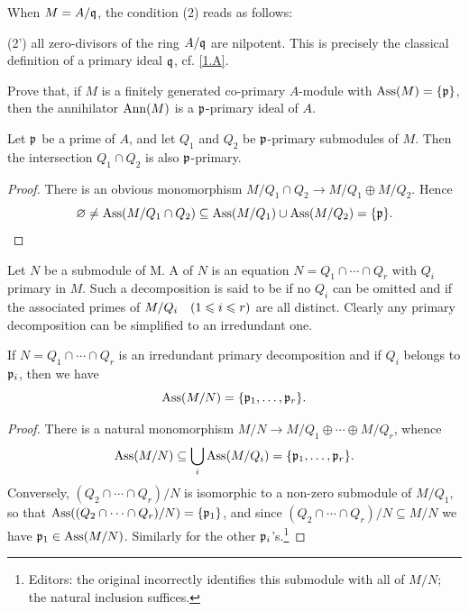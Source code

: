 \documentclass[../main]{subfiles}
\begin{document}
\begin{remark}
When $M = A/\mathfrak{q}$, the condition (2) reads as follows:

(2') all zero-divisors of the ring $A/\mathfrak{q}$ are nilpotent. 
This is precisely the classical definition of a primary ideal $\mathfrak{q}$, cf. \ref{1.A}.
\end{remark} 

\begin{exercise}
Prove that, if $M$ is a finitely generated co-primary $A$-module with $\operatorname{Ass}(M) = \{\mathfrak{p}\}$, then the annihilator $\operatorname{Ann}(M)$ is a $\mathfrak{p}$-primary ideal of $A$.
\end{exercise}

\newparagraph Let $\mathfrak{p}$ be a prime of $A$, and let $Q_1$ and $Q_2$ be $\mathfrak{p}$-primary submodules of $M$. Then the intersection $Q_1\cap Q_2$ is also $\mathfrak{p}$-primary.

\begin{proof}
There is an obvious monomorphism $M/Q_1\cap Q_2\longrightarrow M/Q_1\oplus M/Q_2$. Hence \[\varnothing\neq\operatorname{Ass}(M/Q_1\cap Q_2)\subseteq\operatorname{Ass}(M/Q_1)\cup\operatorname{Ass}(M/Q_2)=\{\mathfrak{p}\}.\]
\end{proof}

\newparagraph Let $N$ be a submodule of M. A  of $N$ is an equation $N = Q_1\cap\cdots\cap Q_r$ with $Q_i$ primary in $M$. Such a decomposition is said to be  if no $Q_i$ can be omitted and if the associated primes of $M/Q_i\for{1\leqslant i\leqslant r}$ are all distinct. Clearly any primary decomposition can be simplified to an irredundant one. 

\begin{parlemma}\label{lem:08.01}
If $N=Q_1\cap\cdots\cap Q_r$ is an irredundant primary decomposition and if $Q_i$ belongs to $\mathfrak{p}_i$, then we have \[\operatorname{Ass}(M/N)=\{\mathfrak{p}_1,\dots,\mathfrak{p}_r\}.\]
\end{parlemma}

\begin{proof}
There is a natural monomorphism $M/N\longrightarrow M/Q_1\oplus\cdots\oplus M/Q_r$, whence \[\operatorname{Ass}(M/N)\subseteq\bigcup_i\operatorname{Ass}(M/Q_i)=\{\mathfrak{p}_1,\dots,\mathfrak{p}_r\}.\] Conversely, $(Q_2\cap\cdots\cap Q_r)/N$ is isomorphic to a non-zero submodule of $M/Q_1$, so that $\operatorname{Ass}((Q_2\cap\cdots\cap Q_r)/N)=\{\mathfrak{p}_1\}$, and since $(Q_2\cap\cdots\cap Q_r)/N\subseteq M/N$ we have $\mathfrak{p}_1\in\operatorname{Ass}(M/N)$. Similarly for the other $\mathfrak{p}_i$'s.\footnote{Editors: the original incorrectly identifies this submodule with all of $M/N$; the natural inclusion suffices.}
\end{proof}
\end{document}
